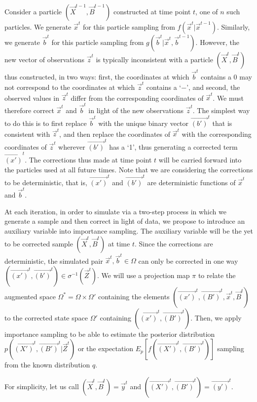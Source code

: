 Consider a particle $(\vec{X}^{t-1},\vec{B}^{t-1})$ constructed at time point $t$, one of $n$ such particles. We generate $\vec{x}^t$ for this particle sampling from $f(\vec{x}^t | \vec{x}^{t-1})$. Similarly, we generate $\vec{b}^{t}$ for this particle sampling from $g(\vec{b}^{t} | \vec{x}^t, \vec{b}^{t-1})$. However, the new vector of observations $\vec{z}^{t}$ is typically inconsistent with a particle $(\vec{X}^{t}, \vec{B}^{t})$ thus constructed, in two ways: first, the coordinates at which $\vec{b}^{t}$ contains a 0 may not correspond to the coordinates at which $\vec{z}^{t}$ contains a `$-$', and second, the observed values in $\vec{z}^{t}$ differ from the corresponding coordinates of $\vec{x}^{t}$. We must therefore correct $\vec{x}^{t}$ and $\vec{b}^{t}$ in light of the new observations $\vec{z}^{t}$. The simplest way to do this is to first replace $\vec{b}^{t}$ with the unique binary vector $\vec{(b')}^{t}$ that is consistent with $\vec{z}^{t}$, and then replace the coordinates of $\vec{x}^{t}$ with the corresponding coordinates of $\vec{z}^{t}$ wherever $\vec{(b')}^{t}$ has a `1', thus generating a corrected term $\vec{(x')}^{t}$. The corrections thus made at time point $t$ will be carried forward into the particles used at all future times. Note that we are considering the corrections to be deterministic, that is, $\vec{(x')}^{t}$ and $\vec{(b')}^{t}$ are deterministic functions of $\vec{x}^{t}$ and $\vec{b}^{t}$.

At each iteration, in order to simulate via a two-step process in which we generate a sample and then correct in light of data, we propose to introduce an auxiliary variable into importance sampling. The auxiliary variable will be the yet to be corrected sample $(\vec{X}^{t}, \vec{B}^{t})$ at time $t$. Since the corrections are deterministic, the simulated pair $\vec{x}^t, \vec{b}^t \in \Omega$ can only be corrected in one way $(\vec{(x')}^t, \vec{(b')}^t) \in \sigma^{-1}(\vec{Z}^t)$. We will use a projection map $\pi$ to relate the augmented space $\Omega^{*} = \Omega \times \Omega'$ containing the elements $(\vec{(x')}^{t}, \vec{(B')}^{t}, \vec{x}^{t}, \vec{B}^{t})$ to the corrected state space $\Omega'$ containing $(\vec{(x')}^{t}, \vec{(B')}^{t})$. Then, we apply importance sampling to be able to estimate the posterior distribution $p(\vec{(X')}^{t}, \vec{(B')}^{t} | \vec{Z}^{t})$ or the expectation $E_{p}[f(\vec{(X')}^{t},\vec{(B')}^{t})]$ sampling from the known distribution $q$.

For simplicity, let us call $(\vec{X}^{t}, \vec{B}^{t}) = \vec{y}^{t}$ and $(\vec{(X')}^{t}, \vec{(B')}^{t}) = \vec{(y')}^{t}$.

